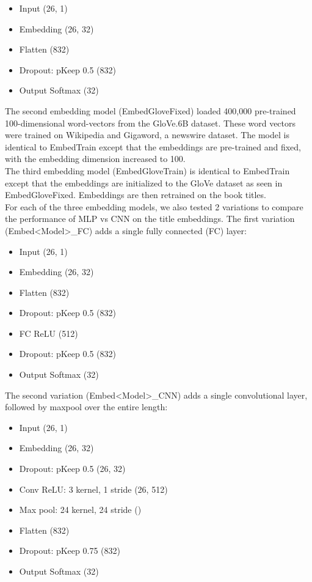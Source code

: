 \documentclass[jou,apacite, 10px]{apa6}
\begin{document}
\begin{itemize}
    \item Input (26, 1)
    \item Embedding (26, 32)
    \item Flatten (832)
    \item Dropout: pKeep 0.5 (832)
    \item Output Softmax (32)
\end{itemize}\rule{0pt}{4ex}
The second embedding model (EmbedGloveFixed) loaded 400,000 pre-trained 100-dimensional word-vectors from the GloVe.6B dataset. These word vectors were trained on Wikipedia and Gigaword, a newswire dataset. The model is identical to EmbedTrain except that the embeddings are pre-trained and fixed, with the embedding dimension increased to 100.\\
The third embedding model (EmbedGloveTrain) is identical to EmbedTrain except that the embeddings are initialized to the GloVe dataset as seen in EmbedGloveFixed. Embeddings are then retrained on the book titles.\\
For each of the three embedding models, we also tested 2 variations to compare the performance of MLP vs CNN on the title embeddings. The first variation (Embed<Model>\_FC) adds a single fully connected (FC) layer:

\begin{itemize}
    \item Input (26, 1)
    \item Embedding (26, 32)
    \item Flatten (832)
    \item Dropout: pKeep 0.5 (832)
    \item FC ReLU (512)
    \item Dropout: pKeep 0.5 (832)
    \item Output Softmax (32)
\end{itemize}\rule{0pt}{4ex}
The second variation (Embed<Model>\_CNN) adds a single convolutional layer, followed by maxpool over the entire length:

\begin{itemize}
    \item Input (26, 1)
    \item Embedding (26, 32)
    \item Dropout: pKeep 0.5 (26, 32)
    \item Conv ReLU: 3 kernel, 1 stride (26, 512)
    \item Max pool: 24 kernel, 24 stride ()
    \item Flatten (832)
    \item Dropout: pKeep 0.75 (832)
    \item Output Softmax (32)\\
\end{itemize}
\end{document}
